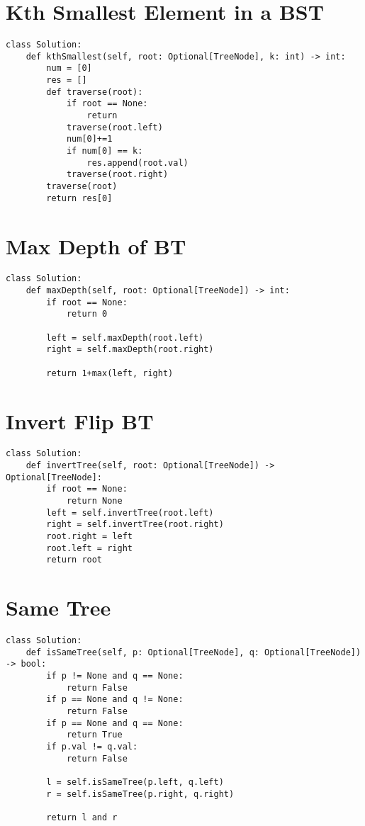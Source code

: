 \documentclass[24pt, a4]{article}
\begin{document}
\section{Kth Smallest Element in a BST}
\begin{lstlisting}
class Solution:
    def kthSmallest(self, root: Optional[TreeNode], k: int) -> int:
        num = [0]
        res = []
        def traverse(root):
            if root == None:
                return
            traverse(root.left)
            num[0]+=1
            if num[0] == k:
                res.append(root.val)
            traverse(root.right)
        traverse(root)
        return res[0]
\end{lstlisting}
\section{Max Depth of BT}
\begin{lstlisting}
class Solution:
    def maxDepth(self, root: Optional[TreeNode]) -> int:
        if root == None:
            return 0
        
        left = self.maxDepth(root.left)
        right = self.maxDepth(root.right)
        
        return 1+max(left, right)
\end{lstlisting}
\section{Invert Flip BT}
\begin{lstlisting}
class Solution:
    def invertTree(self, root: Optional[TreeNode]) -> Optional[TreeNode]:
        if root == None:
            return None
        left = self.invertTree(root.left)
        right = self.invertTree(root.right)
        root.right = left
        root.left = right
        return root
\end{lstlisting}

\section{Same Tree}
\begin{lstlisting}
class Solution:
    def isSameTree(self, p: Optional[TreeNode], q: Optional[TreeNode]) -> bool:
        if p != None and q == None:
            return False
        if p == None and q != None:
            return False
        if p == None and q == None:
            return True
        if p.val != q.val:
            return False
        
        l = self.isSameTree(p.left, q.left)
        r = self.isSameTree(p.right, q.right)
        
        return l and r
\end{lstlisting}
\end{document}
